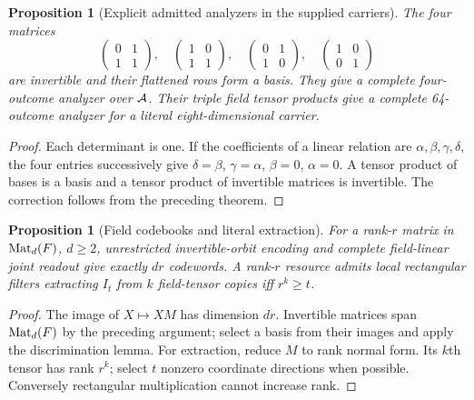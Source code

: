 \documentclass[11pt]{article}
\newtheorem{proposition}[theorem]{Proposition}
\theoremstyle{remark}
\begin{document}
\begin{proposition}[Explicit admitted analyzers in the supplied carriers]
The four matrices
\[
 \begin{pmatrix}0&1\\1&1\end{pmatrix},\quad
 \begin{pmatrix}1&0\\1&1\end{pmatrix},\quad
 \begin{pmatrix}0&1\\1&0\end{pmatrix},\quad
 \begin{pmatrix}1&0\\0&1\end{pmatrix}
\]
are invertible and their flattened rows form a basis. They give a complete
four-outcome analyzer over $\mathcal A$. Their triple field tensor products give a
complete 64-outcome analyzer for a literal eight-dimensional carrier.
\end{proposition}
\begin{proof}
Each determinant is one. If the coefficients of a linear relation are
$\alpha,\beta,\gamma,\delta$, the four entries successively give
$\delta=\beta$, $\gamma=\alpha$, $\beta=0$, $\alpha=0$.
A tensor product of bases is a basis and a tensor product of invertible
matrices is invertible. The correction follows from the preceding theorem.
\end{proof}

\begin{proposition}[Field codebooks and literal extraction]
For a rank-$r$ matrix in $\operatorname{Mat}_d(F)$, $d\geq2$, unrestricted invertible-orbit
encoding and complete field-linear joint readout give exactly $dr$ codewords.
A rank-$r$ resource admits local rectangular filters extracting $I_t$ from $k$
field-tensor copies iff $r^k\geq t$.
\end{proposition}
\begin{proof}
The image of $X\mapsto XM$ has dimension $dr$. Invertible matrices span
$\operatorname{Mat}_d(F)$ by the preceding argument; select a basis from their images and
apply the discrimination lemma. For extraction, reduce $M$ to rank normal
form. Its $k$th tensor has rank $r^k$; select $t$ nonzero coordinate directions
when possible. Conversely rectangular multiplication cannot increase rank.
\end{proof}
\end{document}
